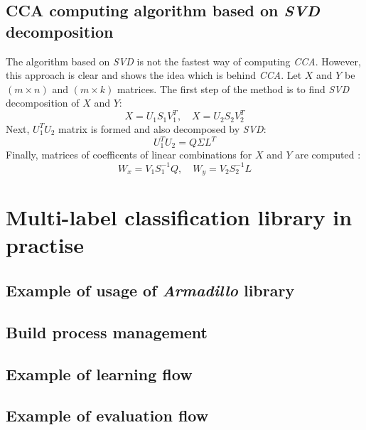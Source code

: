\begin{appendices}
\newpage
\section{CCA computing algorithm based on \textit{SVD} decomposition}
\label{app:cca}

The algorithm based on \textit{SVD} is not the fastest way of computing \textit{CCA}. However, this approach is clear and shows the idea which is behind \textit{CCA}. Let $X$ and $Y$ be $(m \times n)$ and $(m \times k)$ matrices. The first step of the method is to find \textit{SVD} decomposition of $X$ and $Y$:
\begin{equation}
    X=U_1S_1V^T_1, \quad X=U_2S_2V^T_2
\end{equation}
Next, $U_1^TU_2$ matrix is formed and also decomposed by \textit{SVD}:
\begin{equation}
    U_1^TU_2 = Q\Sigma{L^T}
\end{equation}
Finally, matrices of coefficents of linear combinations for $X$ and $Y$ are computed \cite{William}:
\begin{equation}
    W_x=V_1S_1^{-1}Q, \quad  W_y=V_2S_2^{-1}L
\end{equation}


\chapter{Multi-label classification library in practise}
\section{Example of usage of \textit{Armadillo} library}
\label{app:arma}


\newpage
\section{Build process management}
\label{app:build}

\newpage
\section{Example of learning flow}


\newpage
\section{Example of evaluation flow}


\end{appendices}
